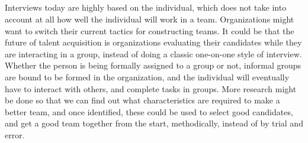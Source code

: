 \documentclass[letterpaper,12pt]{article}
\begin{document}
\subsection{}
Interviews today are highly based on the individual, which does not take into account at all
how well the individual will work in a team.
Organizations might want to switch their current tactics for
constructing teams. It could be that the future of talent acquisition is organizations evaluating their
candidates while they are interacting in a group, instead of doing a classic one-on-one style of interview. Whether the person is being formally assigned to a group or not, informal groups are bound to be formed in the organization, and the individual will eventually have to interact with others, and complete tasks in groups. More research might be done so that
we can find out what characteristics are required to make a better team, and once identified, these could be used to
select good candidates, and get a good team together from the start, methodically, instead of by trial and error.
\end{document}
